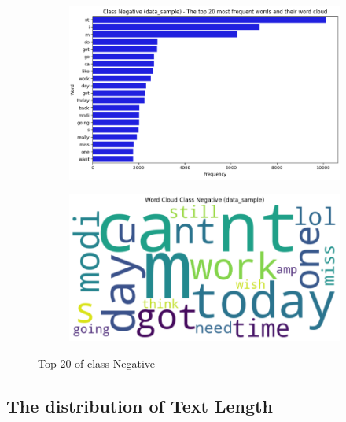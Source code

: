 \begin{figure}[H]
    \centering
    \begin{subfigure}[b]{0.48\textwidth}
        \includegraphics[width=\textwidth]{img/visualize_pic/top20_nega.png}
    \end{subfigure}
    \begin{subfigure}[b]{0.48\textwidth}
        \includegraphics[width=\textwidth]{img/visualize_pic/nega_wordcloud.png}
    \end{subfigure}
    \caption{Top 20 of class Negative}
\end{figure}

\subsection{The distribution of Text Length}

